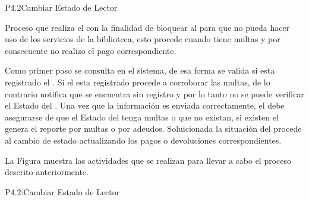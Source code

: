 




\begin{Proceso}{P4.2}{Cambiar Estado de Lector} {
  

  Proceso que realiza el  con la finalidad de bloquear al  para que no pueda hacer uso de los servicios de la biblioteca, esto procede cuando tiene multas y por consecuente no realizo el pago correspondiente.
  
  
   Como primer paso se consulta en el sistema, de esa forma se valida si esta registrado el . Si el  esta registrado procede a corroborar las multas,  de lo contrario notifica que se encuentra sin registro y por lo tanto no se puede verificar el Estado del .
  Una vez que la información es enviada correctamente, el   debe asegurarse de que el Estado del  tenga multas  o que no existan, si existen el   genera el reporte por multas  o por adeudos. Soluicionada la situación del   procede al cambio de estado actualizando los pagos o devoluciones correspondientes.
  



  \noindent La Figura  muestra las actividades que se realizan para llevar a cabo el proceso descrito anteriormente.


} {P4.2:Cambiar Estado de Lector}



\end{Proceso}
